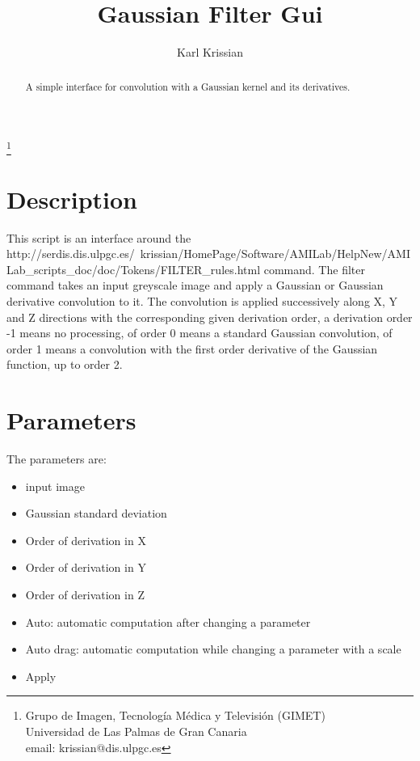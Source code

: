 \documentclass{article}
\begin{document}
\title{Gaussian Filter Gui}
\author{Karl Krissian}
\thanks{
Grupo de Imagen, Tecnolog\'ia M\'edica y Televisi\'on (GIMET)\\
Universidad de Las Palmas de Gran Canaria\\
email: krissian@dis.ulpgc.es
}


\maketitle

\begin{abstract}
A simple interface for convolution with a Gaussian kernel and its derivatives.
\end{abstract}


\section{Description}
This script is an interface around the 
{http://serdis.dis.ulpgc.es/~krissian/HomePage/Software/AMILab/HelpNew/AMILab_scripts_doc/doc/Tokens/FILTER_rules.html}
command.
The filter command takes an input greyscale image and apply a Gaussian or Gaussian derivative convolution to it.
The convolution is applied successively along X, Y and Z directions with the corresponding given derivation order, a derivation order -1 means no processing, of order 0 means a standard Gaussian convolution, of order 1 means a convolution with the first order derivative of the Gaussian function, up to order 2.\\


\section{Parameters}

The parameters are:
\begin{itemize}
 \item input image
 \item Gaussian standard deviation
 \item Order of derivation in X
 \item Order of derivation in Y
 \item Order of derivation in Z
 \item Auto: automatic computation after changing a parameter
 \item Auto drag: automatic computation while changing a parameter with a scale
 \item Apply
\end{itemize}
\end{document}
